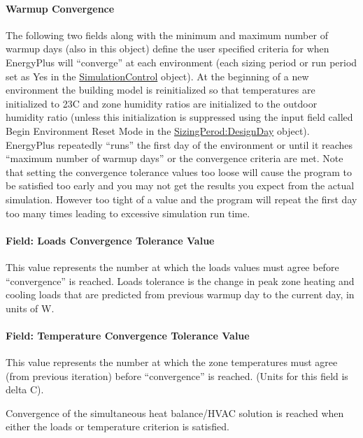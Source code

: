 \paragraph{Warmup Convergence}\label{warmup-convergence}

The following two fields along with the minimum and maximum number of warmup days (also in this object) define the user specified criteria for when EnergyPlus will ``converge'' at each environment (each sizing period or run period set as Yes in the \hyperref[simulationcontrol]{SimulationControl} object). At the beginning of a new environment the building model is reinitialized so that temperatures are initialized to 23C and zone humidity ratios are initialized to the outdoor humidity ratio  (unless this initialization is suppressed using the input field called Begin Environment Reset Mode in the \hyperref[sizingperioddesignday]{SizingPerod:DesignDay} object). EnergyPlus repeatedly ``runs'' the first day of the environment or until it reaches ``maximum number of warmup days'' or the convergence criteria are met. Note that setting the convergence tolerance values too loose will cause the program to be satisfied too early and you may not get the results you expect from the actual simulation. However too tight of a value and the program will repeat the first day too many times leading to excessive simulation run time.

\paragraph{Field: Loads Convergence Tolerance Value}\label{field-loads-convergence-tolerance-value}

This value represents the number at which the loads values must agree before ``convergence'' is reached. Loads tolerance is the change in peak zone heating and cooling loads that are predicted from previous warmup day to the current day, in units of W.

\paragraph{Field: Temperature Convergence Tolerance Value}\label{field-temperature-convergence-tolerance-value}

This value represents the number at which the zone temperatures must agree (from previous iteration) before ``convergence'' is reached. (Units for this field is delta C).

Convergence of the simultaneous heat balance/HVAC solution is reached when either the loads or temperature criterion is satisfied.

